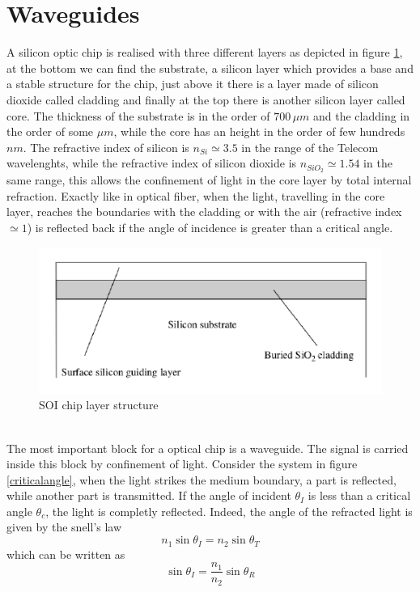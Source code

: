 \section{Waveguides}
A silicon optic chip is realised with three different layers as depicted in figure \ref{SOIstructure}, at the bottom we can find the substrate, a silicon layer which provides a base and a stable structure for the chip, just above it there is a layer made of silicon dioxide called cladding and finally at the top there is another silicon layer called core. The thickness of the substrate is in the order of $700\, \mu m $ and the cladding in the order of some $\mu m$, while the core has an height in the order of few hundreds $nm$. The refractive index of silicon is $n_{Si} \simeq 3.5$ in the range of the Telecom wavelenghts, while the refractive index of silicon dioxide is $n_{SiO_2}\simeq 1.54$ in the same range, this allows the confinement of light in the core layer by total internal refraction. Exactly like in optical fiber, when the light, travelling in the core layer, reaches the boundaries with the cladding or with the air (refractive index $\simeq 1$) is reflected back if the angle of incidence is greater than a critical angle. 
\begin{figure}
\centering
\includegraphics[width = .7\textwidth]{img/SOIstructure}
\caption{SOI chip layer structure}
\label{SOIstructure}
\end{figure}
\\The most important block for a optical chip is a waveguide. The signal is carried inside this block by confinement of light. Consider the system in figure \ref{criticalangle}, when the light strikes the medium boundary, a part is reflected, while another part is transmitted. If the angle of incident $\theta_I$ is less than a critical angle $\theta_c$, the light is completly reflected. Indeed, the angle of the refracted light is given by the snell's law
\begin{equation}n_1 \sin \theta_I = n_2 \sin \theta_T\end{equation}
which can be written as
\begin{equation}\sin \theta_I = \frac{n_1}{n_2}\sin \theta_R\end{equation}
